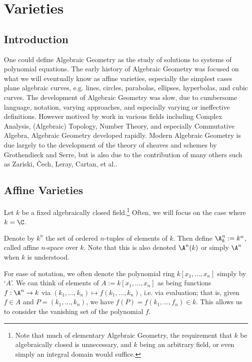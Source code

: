 \newpage
\section{Varieties}
\subsection{Introduction}

One could define Algebraic Geometry as the study of solutions to systems of polynomial equations. The early history of Algebraic Geometry was focused on what we will eventually know as affine varieties, especially the simplest cases plane algebraic curves, e.g. lines, circles, parabolas, ellipses, hyperbolas, and cubic curves. The development of Algebraic Geometry was slow, due to cumbersome language, notation, varying approaches, and especially varying or ineffective definitions. However motived by work in various fields including Complex Analysis, (Algebraic) Topology, Number Theory, and especially Commutative Algebra, Algebraic Geometry developed rapidly. Modern Algebraic Geometry is due largely to the development of the theory of sheaves and schemes by Grothendieck and Serre, but is also due to the contribution of many others such as  Zariski, \v{C}ech, Leray, Cartan, et al.. 



\subsection{Affine Varieties}

Let $k$ be a fixed algebraically closed field.\footnote{Note that much of elementary Algebraic Geometry, the requirement that $k$ be algebraically closed is unnecessary, and $k$ being an arbitrary field, or even simply an integral domain would suffice.} Often, we will focus on the case where $k= \C$.


\begin{dfn}
Denote by $k^n$ the set of ordered $n$-tuples of elements of $k$. Then define $\A_k^n:= k^n$, called affine $n$-space over $k$. Note that this is also denoted $\A^n(k)$ or simply $\A^n$ when $k$ is understood. 
\end{dfn}


For ease of notation, we often denote the polynomial ring $k[x_1,\ldots,x_n]$ simply by `$A$'. We can think of elements of $A:= k[x_1,\ldots,x_n]$ as being functions $f: \A^n \to k$ via $(k_1,\ldots,k_n) \mapsto f(k_1,\ldots,k_n)$, i.e. via evaluation; that is, given $f \in A$ and $P=(k_1,\ldots,k_n)$, we have $f(P)= f(k_1,\ldots,f_n) \in k$. This allows us to consider the vanishing set of the polynomial $f$. 


